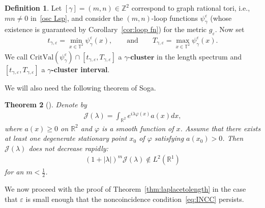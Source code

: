 \documentclass[11pt,letterpaper,oneside]{amsart}
\newcommand{\Z}{\mathbb{Z}}
\newcommand{\R}{\mathbb{R}}
\newcommand{\T}{\mathbb{T}}
\renewcommand{\phi}{\varphi}
\newtheorem{theo}{Theorem}[section]
\theoremstyle{definition}
\newtheorem{def1}[theo]{Definition}
\theoremstyle{remark}
\newcommand{\eps}{\varepsilon}
\newcommand{\J}{\mathcal{J}}
\theoremstyle{definition}
\theoremstyle{remark}
\begin{document}
\begin{def1}\label{def:clusters}
    Let $[\gamma] = (m,n) \in \Z^2$ correspond to graph rational tori, i.e., $mn \neq 0$ in~\eqref{osc Lsp}, and consider the $(m,n)$-loop functions $\psi_\gamma^\eps$ (whose existence is guaranteed by Corollary~\ref{cor:loop fn}) for the metric $g_\eps$. Now set
    \begin{align*}
        t_{\gamma, \eps} = \min_{x \in \T^2} \psi_\gamma^\eps(x), \qquad \text{and} \qquad T_{\gamma, \eps} = \max_{x \in \T^2} \psi_\gamma^\eps(x). 
    \end{align*}
    We call $\text{CritVal}(\psi_\gamma^\eps) \cap [t_{\gamma, \eps}, T_{\gamma, \eps}]$ a $\textbf{$\gamma$-cluster}$ in the length spectrum and $[t_{\gamma,\eps}, T_{\gamma,\eps}]$ a \textbf{$\gamma$-cluster interval}.
\end{def1}

We will also need the following theorem of Soga.

\begin{theo}[\cite{Soga}]\label{SogasTheorem}
    Denote by
    \begin{align*}
        \J(\lambda) = \int_{\R^2} e^{i \lambda \phi(x)} a(x) dx,
    \end{align*}
    where $a(x) \ge 0$ on $\mathbb{R}^2$ and $\phi$ is a smooth function of $x$. Assume that there exists at least one degenerate stationary point $x_0$ of $\phi$ satisfying $a(x_0) > 0$. Then $\J(\lambda)$ does not decrease rapidly:
\begin{align*}
    (1 + |\lambda|)^m \J(\lambda) \notin L^2(\mathbb{R}^1)
\end{align*}
for an $m < \frac{1}{2}$.
\end{theo}

We now proceed with the proof of Theorem~\ref{thm:laplacetolength} in the case that $\eps$ is small enough that the noncoincidence condition~\eqref{eq:INCC} persists.
\end{document}
